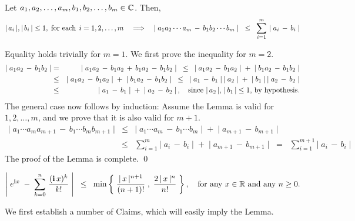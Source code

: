\begin{lemma}
\label{BillingsleyThreeFiveEight}
Let $a_{1},a_{2},\ldots,a_{m},b_{1},b_{2},\ldots,b_{m}\in\mathbb{C}$.
Then,
\begin{equation*}
\vert\,a_{i}\,\vert, \vert\,b_{i}\,\vert \leq 1,
\;\textnormal{for each}\;\, i = 1, 2, \ldots, m
\quad\Longrightarrow\quad
\vert\;a_{1} a_{2} \cdots a_{m} \,-\, b_{1}b_{2}\cdots b_{m}\;\vert
\;\; \leq \;\;
\sum_{i=1}^{m}\,\left\vert\; a_{i} \, - \, b_{i} \;\right\vert
\end{equation*}
\end{lemma}
\proof
Equality holds trivially for $m = 1$. We first prove the inequality for $m = 2$.
\begin{eqnarray*}
\left\vert\; a_{1}a_{2} \,-\, b_{1}b_{2} \;\right\vert
&=& \left\vert\; a_{1}a_{2} \,-\, b_{1}a_{2} \,+\, b_{1}a_{2} \,-\, b_{1}b_{2} \;\right\vert
\;\;\leq\;\; \left\vert\; a_{1}a_{2} \,-\, b_{1}a_{2} \;\right\vert \;+\; \left\vert\; b_{1}a_{2} \,-\, b_{1}b_{2} \;\right\vert
\\
&\leq& \left\vert\; a_{1}a_{2} \,-\, b_{1}a_{2} \;\right\vert \;+\; \left\vert\; b_{1}a_{2} \,-\, b_{1}b_{2} \;\right\vert
\;\;\leq\;\; \left\vert\; a_{1} \,-\, b_{1} \;\right\vert \left\vert\;a_{2}\;\right\vert \;+\; \left\vert\;b_{1}\;\right\vert \left\vert\; a_{2} \,-\, b_{2} \;\right\vert
\\
&\leq& \left\vert\; a_{1} \,-\, b_{1} \;\right\vert \;+\; \left\vert\; a_{2} \,-\, b_{2} \;\right\vert,
\quad\textnormal{since $\vert\,a_{2}\,\vert$, $\vert\,b_{1}\,\vert \leq 1$, by hypothesis}.
\end{eqnarray*}
The general case now follows by induction: Assume the Lemma is valid for $1, 2, \ldots, m$,
and we prove that it is also valid for $m+1$.
\begin{eqnarray*}
\vert\;a_{1}\cdots a_{m}a_{m+1} \,-\, b_{1}\cdots b_{m}b_{m+1}\;\vert
&\leq& \vert\;a_{1}\cdots a_{m} \,-\, b_{1}\cdots b_{m}\;\vert \;+\; \vert\;a_{m+1} \,-\, b_{m+1}\;\vert
\\
&\leq& \sum_{i=1}^{m}\vert\;a_{i} \,-\, b_{i}\;\vert \;+\; \vert\;a_{m+1} \,-\, b_{m+1}\;\vert
\;\;=\;\; \sum_{i=1}^{m+1}\vert\;a_{i} \,-\, b_{i}\;\vert
\end{eqnarray*}
The proof of the Lemma is complete.
\qed

\begin{lemma}
\label{BillingsleyThreeFourThree}
\mbox{}\vskip 0.2cm
\noindent
\begin{equation*}
\left\vert\;e^{\textnormal{\bf i} x} \;-\; \sum_{k = 0}^{n}\,\dfrac{(\textnormal{\bf i}\,x)^{k}}{k!} \;\right\vert
\;\;\leq\;\;
\min\left\{\;\dfrac{\vert\,x\,\vert^{n+1}}{(n+1)!}\;,\;\dfrac{2\,\vert\,x\,\vert^{n}}{n!}\;\right\},
\quad
\textnormal{for any $x \in \mathbb{R}$ and any $n \geq 0$.}
\end{equation*}
\end{lemma}
\proof
We first establish a number of Claims, which will easily imply the Lemma.

